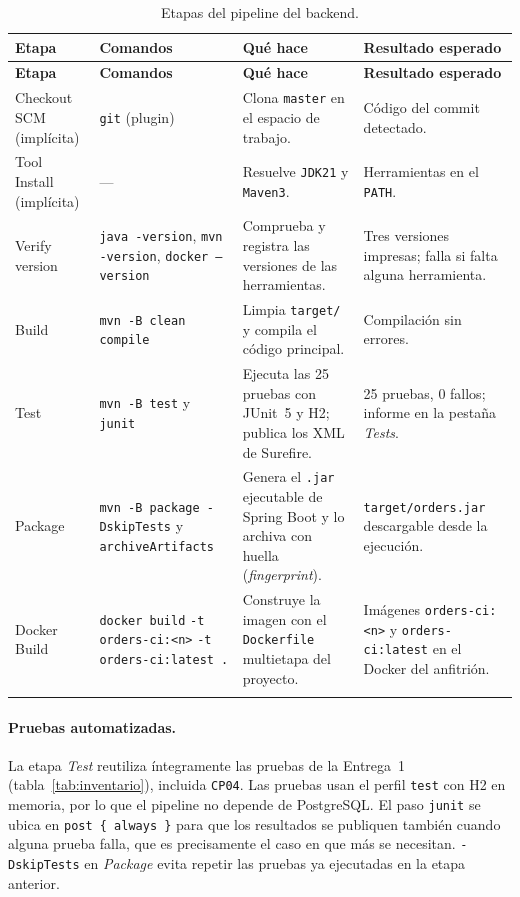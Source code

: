 \documentclass[11pt,a4paper]{article}
\begin{document}
\begin{longtable}{@{}P{2.1cm} P{3.7cm} P{4.6cm} P{4.0cm}@{}}
\toprule
\textbf{Etapa} & \textbf{Comandos} & \textbf{Qué hace} & \textbf{Resultado esperado}\\
\midrule
\endfirsthead
\toprule
\textbf{Etapa} & \textbf{Comandos} & \textbf{Qué hace} & \textbf{Resultado esperado}\\
\midrule
\endhead
Checkout SCM (implícita) & \texttt{git} (plugin) & Clona \texttt{master} en el espacio de trabajo. &
Código del commit detectado.\\
Tool Install (implícita) & --- & Resuelve \texttt{JDK21} y \texttt{Maven3}. & Herramientas en el
\texttt{PATH}.\\
Verify version & \texttt{java -version}, \texttt{mvn -version}, \texttt{docker --version} &
Comprueba y registra las versiones de las herramientas. & Tres versiones impresas; falla si falta
alguna herramienta.\\
Build & \texttt{mvn -B clean compile} & Limpia \texttt{target/} y compila el código principal. &
Compilación sin errores.\\
Test & \texttt{mvn -B test} y \texttt{junit} & Ejecuta las 25 pruebas con JUnit~5 y H2; publica los
XML de Surefire. & 25 pruebas, 0 fallos; informe en la pestaña \emph{Tests}.\\
Package & \texttt{mvn -B package -DskipTests} y \texttt{archiveArtifacts} & Genera el \texttt{.jar}
ejecutable de Spring Boot y lo archiva con huella (\emph{fingerprint}). & \texttt{target/orders.jar}
descargable desde la ejecución.\\
Docker Build & \texttt{docker build} \texttt{-t orders-ci:<n>} \texttt{-t orders-ci:latest .} &
Construye la imagen con el \texttt{Dockerfile} multietapa del proyecto. & Imágenes
\texttt{orders-ci:<n>} y \texttt{orders-ci:latest} en el Docker del anfitrión.\\
\bottomrule
\caption{Etapas del pipeline del backend.}
\label{tab:etapas}
\end{longtable}

\paragraph{Pruebas automatizadas.} La etapa \emph{Test} reutiliza íntegramente las pruebas de la
Entrega~1 (tabla~\ref{tab:inventario}), incluida \texttt{CP04}. Las pruebas usan el perfil
\texttt{test} con H2 en memoria, por lo que el pipeline no depende de PostgreSQL. El paso
\texttt{junit} se ubica en \texttt{post \{ always \}} para que los resultados se publiquen también
cuando alguna prueba falla, que es precisamente el caso en que más se necesitan.
\texttt{-DskipTests} en \emph{Package} evita repetir las pruebas ya ejecutadas en la etapa anterior.
\end{document}
